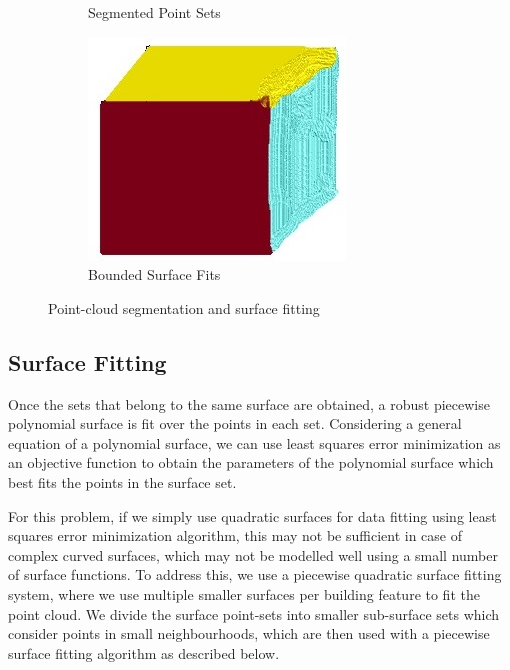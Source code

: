 \documentclass[12pt,a4paper]{article}
\begin{document}
\begin{figure}
\begin{subfigure}[b]{0.23\textwidth}
            \caption{Segmented Point Sets}
            \label{fig:psets}
        \end{subfigure}%
        \quad \quad
        \begin{subfigure}[b]{0.23\textwidth}
            \centering
            \includegraphics[width=\textwidth]{planes.jpg}
            \caption{Bounded Surface Fits}
            \label{fig:planes}
        \end{subfigure}%
        
        \caption{Point-cloud segmentation and surface fitting}
    \end{figure}
    
    
    \subsection{Surface Fitting}
    
    Once the sets that belong to the same surface are obtained, a robust piecewise polynomial surface is fit over the points in each set. Considering a general equation of a polynomial surface, we can use least squares error minimization as an objective function to obtain the parameters of the polynomial surface which best fits the points in the surface set.
    
    For this problem, if we simply use quadratic surfaces for data fitting using least squares error minimization algorithm, this may not be sufficient in case of complex curved surfaces, which may not be modelled well using a small number of surface functions. To address this, we use a piecewise quadratic surface fitting system, where we use multiple smaller surfaces per building feature to fit the point cloud. We divide the surface point-sets into smaller sub-surface sets which consider points in small neighbourhoods, which are then used with a piecewise surface fitting algorithm as described below.
    
\end{document}
